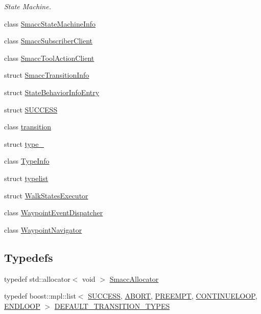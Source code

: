 \begin{DoxyCompactItemize}
\begin{DoxyCompactList}\small\item\em State Machine. \end{DoxyCompactList}\item 
class \hyperlink{classsmacc_1_1SmaccStateMachineInfo}{Smacc\+State\+Machine\+Info}
\item 
class \hyperlink{classsmacc_1_1SmaccSubscriberClient}{Smacc\+Subscriber\+Client}
\item 
class \hyperlink{classsmacc_1_1SmaccToolActionClient}{Smacc\+Tool\+Action\+Client}
\item 
struct \hyperlink{structsmacc_1_1SmaccTransitionInfo}{Smacc\+Transition\+Info}
\item 
struct \hyperlink{structsmacc_1_1StateBehaviorInfoEntry}{State\+Behavior\+Info\+Entry}
\item 
struct \hyperlink{structsmacc_1_1SUCCESS}{S\+U\+C\+C\+E\+SS}
\item 
class \hyperlink{classsmacc_1_1transition}{transition}
\item 
struct \hyperlink{structsmacc_1_1type__}{type\+\_\+}
\item 
class \hyperlink{classsmacc_1_1TypeInfo}{Type\+Info}
\item 
struct \hyperlink{structsmacc_1_1typelist}{typelist}
\item 
struct \hyperlink{structsmacc_1_1WalkStatesExecutor}{Walk\+States\+Executor}
\item 
class \hyperlink{classsmacc_1_1WaypointEventDispatcher}{Waypoint\+Event\+Dispatcher}
\item 
class \hyperlink{classsmacc_1_1WaypointNavigator}{Waypoint\+Navigator}
\end{DoxyCompactItemize}
\subsection*{Typedefs}
\begin{DoxyCompactItemize}
\item 
typedef std\+::allocator$<$ void $>$ \hyperlink{namespacesmacc_ac43548af6721e408234339fcf1ab1254}{Smacc\+Allocator}
\item 
typedef boost\+::mpl\+::list$<$ \hyperlink{structsmacc_1_1SUCCESS}{S\+U\+C\+C\+E\+SS}, \hyperlink{structsmacc_1_1ABORT}{A\+B\+O\+RT}, \hyperlink{structsmacc_1_1PREEMPT}{P\+R\+E\+E\+M\+PT}, \hyperlink{structsmacc_1_1CONTINUELOOP}{C\+O\+N\+T\+I\+N\+U\+E\+L\+O\+OP}, \hyperlink{structsmacc_1_1ENDLOOP}{E\+N\+D\+L\+O\+OP} $>$ \hyperlink{namespacesmacc_a5238572f5e2747391ba919540aaf70bd}{D\+E\+F\+A\+U\+L\+T\+\_\+\+T\+R\+A\+N\+S\+I\+T\+I\+O\+N\+\_\+\+T\+Y\+P\+ES}
\end{DoxyCompactItemize}
